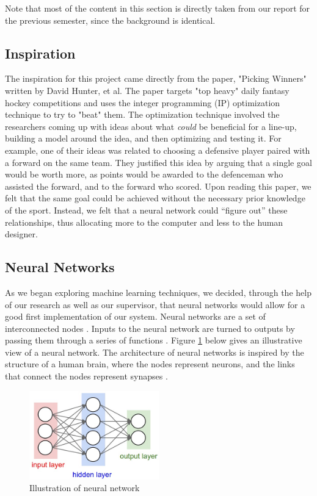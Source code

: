 Note that most of the content in this section is directly taken from our report for the previous semester, since the background is identical.
\subsection{Inspiration}
The inspiration for this project came directly from the paper, "Picking Winners" written by David Hunter, et al. The paper targets "top heavy" daily fantasy hockey competitions and uses the integer programming (IP) optimization technique to try to "beat" them. The optimization technique involved the researchers coming up with ideas about what \textit{could} be beneficial for a line-up, building a model around the idea, and then optimizing and testing it. For example, one of their ideas was related to choosing a defensive player paired with a forward on the same team. They justified this idea by arguing that a single goal would be worth more, as points would be awarded to the defenceman who assisted the forward, and to the forward who scored.  Upon reading this paper, we felt that the same goal could be achieved without the necessary prior knowledge of the sport. Instead, we felt that a neural network could ``figure out'' these relationships, thus allocating more to the computer and less to the human designer.

\subsection{Neural Networks}
As we began exploring machine learning techniques, we decided, through the help of our research as well as our supervisor, that neural networks would allow for a good first implementation of our system. Neural networks are a set of interconnected nodes \cite{neural_net}. Inputs to the neural network are turned to outputs by passing them through a series of functions \cite{neural_net}. Figure \ref{fig:neural_net} below gives an illustrative view of a neural network. The architecture of neural networks is inspired by the structure of a human brain, where the nodes represent neurons, and the links that connect the nodes represent synapses \cite{neural_net}.

\begin{figure}[ht]
    \centering
    \includegraphics[width=0.50\textwidth]{figures/neural_net}
    \caption{Illustration of neural network \cite{neural_net} }
    \label{fig:neural_net}
\end{figure}

